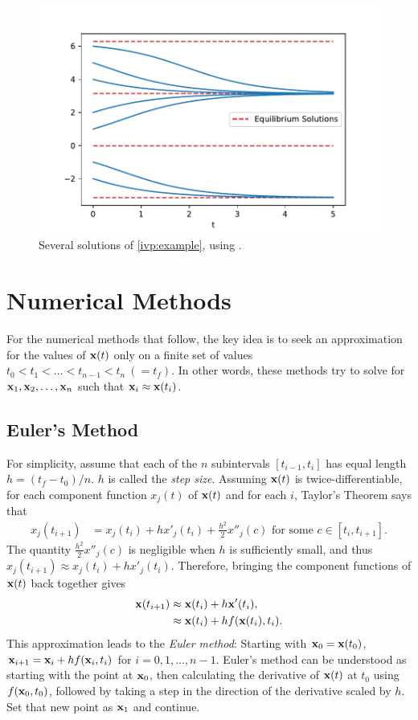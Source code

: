 \begin{figure}[H]
\centering
\includegraphics[width=\textwidth]{figures/example2.pdf}
\caption{Several solutions of \eqref{ivp:example}, using . }
\label{ivp:int_curves}
\end{figure}


\section*{Numerical Methods}
For the numerical methods that follow, the key idea is to seek an approximation for the values of $\mathbf{x}(t)$ only on a finite set of values $t_0 < t_1 < \hdots < t_{n-1} < t_n \ (= t_f)$.
In other words, these methods try to solve for $\mathbf{x}_1,\mathbf{x}_2,\hdots,\mathbf{x}_n$ such that $\mathbf{x}_i \approx \mathbf{x}(t_i)$.

\subsection*{Euler's Method}
For simplicity, assume that each of the $n$ subintervals $[t_{i-1},t_i]$ has equal length $h = (t_f-t_0)/n$. $h$ is called the \textit{step size}.
Assuming $\mathbf{x}(t)$ is twice-differentiable, for each component function $x_j(t)$ of $\mathbf{x}(t)$ and for each $i$, Taylor's Theorem says that
\begin{align*}
x_j(t_{i+1}) &= x_j(t_{i}) + h x'_j(t_i) + \frac{h^2}{2} x''_j(c)\text{ for some } c \in [t_i,t_{i+1}].
\end{align*}
The quantity $\frac{h^2}{2} x''_j(c)$ is negligible when $h$ is sufficiently small, and thus $x_j(t_{i+1}) \approx x_j(t_i) + h x'_j(t_i)$.
Therefore, bringing the component functions of $\mathbf{x}(t)$ back together gives
\begin{align*}
\mathbf{x}(t_{i+1}) &\approx \mathbf{x}(t_i) + h \mathbf{x}'(t_i)  ,\\
&\approx \mathbf{x}(t_{i}) + h f(\mathbf{x}(t_i),t_i).
\end{align*}
This approximation leads to the \textit{Euler method}: Starting with $\mathbf{x}_0 = \mathbf{x}(t_0)$, $\mathbf{x}_{i+1} = \mathbf{x}_i +hf(\mathbf{x}_i,t_i)$ for $i = 0, 1, \hdots, n-1$.
Euler's method can be understood as starting with the point at $\mathbf{x}_0$, then calculating the derivative of $\mathbf{x}(t)$ at $t_0$ using $f(\mathbf{x}_0,t_0)$, followed by taking a step in the direction of the derivative scaled by $h$. Set that new point as $\mathbf{x}_1$ and continue.

